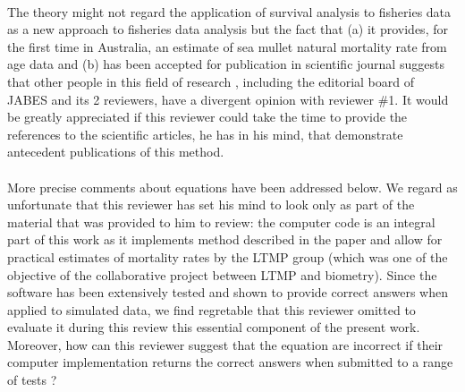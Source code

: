\documentclass[11pt]{article}
\begin{document}
\begin{spacing}{1.2}

\\
The theory might not regard the application of survival analysis to fisheries data as a new approach to fisheries data analysis but the fact that (a) it provides, for the first time in Australia, an estimate of sea mullet natural mortality rate from age data and (b) has been accepted for publication in scientific journal suggests that other people in this field of research , including the editorial board of JABES and its 2 reviewers, have a divergent opinion with reviewer \#1. It would be greatly appreciated if this reviewer could take the time to provide the references to the scientific articles, he has in his mind, that demonstrate antecedent publications of this method. \\

\\
More precise comments about equations have been addressed below. We regard as unfortunate that this reviewer has set his mind to look only as part of the material that was provided to him to review: the computer code is an integral part of this work as it implements method described in the paper and allow for practical estimates of mortality rates by the LTMP group (which was one of the objective of the collaborative project between LTMP and biometry). Since the software has been extensively tested and shown to provide correct answers when applied to simulated data, we find regretable that this reviewer omitted to evaluate it during this review this essential component of the present work. Moreover, how can this reviewer suggest that the equation are incorrect if their computer implementation returns the correct answers when submitted to a range of tests ?\\


\end{spacing}
\end{document}
